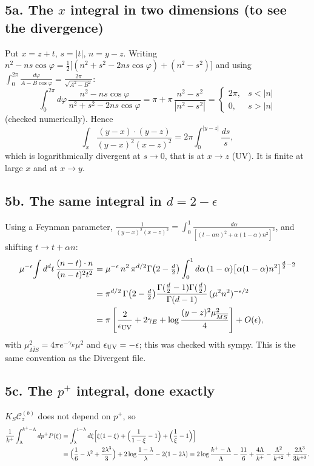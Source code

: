 \documentclass[10pt]{article}
\numberwithin{equation}{section}
\newcommand{\Cz}{\mathcal{C}^{(b)}_{z}}
\begin{document}
\subsection*{5a. The $x$ integral in two dimensions (to see the divergence)}
Put $x=z+t$, $s=|t|$, $n=y-z$. Writing $n^{2}-ns\cos\varphi=\tfrac12\big[(n^{2}+s^{2}-2ns\cos\varphi)+(n^{2}-s^{2})\big]$ and using $\int_{0}^{2\pi}\frac{d\varphi}{A-B\cos\varphi}=\frac{2\pi}{\sqrt{A^{2}-B^{2}}}$:
\begin{equation}
\int_{0}^{2\pi}d\varphi\,\frac{n^{2}-ns\cos\varphi}{n^{2}+s^{2}-2ns\cos\varphi}=\pi+\pi\,\frac{n^{2}-s^{2}}{|n^{2}-s^{2}|}=\begin{cases}2\pi,&s<|n|\\0,&s>|n|\end{cases}
\end{equation}
(checked numerically). Hence
\begin{equation}
\int_{x}\frac{(y-x)\cdot(y-z)}{(y-x)^{2}(x-z)^{2}}=2\pi\int_{0}^{|y-z|}\frac{ds}{s},
\end{equation}
which is logarithmically divergent at $s\to0$, that is at $x\to z$ (UV). It is finite at large $x$ and at $x\to y$.

\subsection*{5b. The same integral in $d=2-\epsilon$}
Using a Feynman parameter, $\frac{1}{(y-x)^{2}(x-z)^{2}}=\int_{0}^{1}\frac{d\alpha}{[(t-\alpha n)^{2}+\alpha(1-\alpha)n^{2}]^{2}}$, and shifting $t\to t+\alpha n$:
\begin{align}
\mu^{-\epsilon}\!\int d^{d}t\,\frac{(n-t)\cdot n}{(n-t)^{2}t^{2}}&=\mu^{-\epsilon}\,n^{2}\,\pi^{d/2}\Gamma\big(2-\tfrac d2\big)\int_{0}^{1}d\alpha\,(1-\alpha)\big[\alpha(1-\alpha)n^{2}\big]^{\frac d2-2}\notag\\
&=\pi^{d/2}\,\Gamma\big(2-\tfrac d2\big)\frac{\Gamma(\frac d2-1)\Gamma(\frac d2)}{\Gamma(d-1)}\,(\mu^{2}n^{2})^{-\epsilon/2}\notag\\
&=\pi\left[\frac{2}{\epsilon_{\rm UV}}+2\gamma_{E}+\log\frac{(y-z)^{2}\mu^{2}_{\overline{MS}}}{4}\right]+O(\epsilon),
\end{align}
with $\mu^{2}_{\overline{MS}}=4\pi e^{-\gamma_{E}}\mu^{2}$ and $\epsilon_{\rm UV}=-\epsilon$; this was checked with sympy. This is the same convention as the Divergent file.

\subsection*{5c. The $p^{+}$ integral, done exactly}
$K_{S}\Cz$ does not depend on $p^{+}$, so
\begin{align}
\frac{1}{k^{+}}\int_{\Lambda}^{k^{+}-\Lambda}dp^{+}P(\xi)&=\int_{\lambda}^{1-\lambda}d\xi\Big[\xi(1-\xi)+\Big(\frac{1}{1-\xi}-1\Big)+\Big(\frac{1}{\xi}-1\Big)\Big]\notag\\
&=\Big(\frac16-\lambda^{2}+\frac{2\lambda^{3}}{3}\Big)+2\log\frac{1-\lambda}{\lambda}-2(1-2\lambda)
=2\log\frac{k^{+}-\Lambda}{\Lambda}-\frac{11}{6}+\frac{4\Lambda}{k^{+}}-\frac{\Lambda^{2}}{k^{+2}}+\frac{2\Lambda^{3}}{3k^{+3}} .
\end{align}
\end{document}
